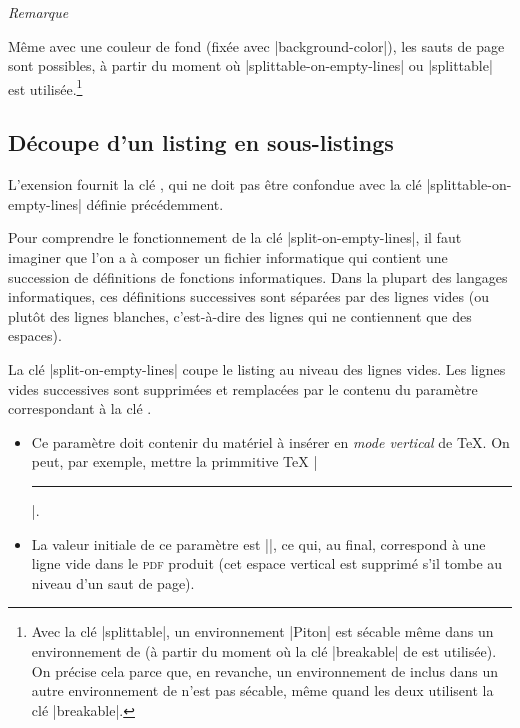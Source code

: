 \documentclass[dvipsnames,svgnames]{article}
\begin{document}
\medskip
\emph{Remarque}\par\nobreak

Même avec une couleur de fond (fixée avec |background-color|), les sauts de page sont
possibles, à partir du moment où |splittable-on-empty-lines| ou |splittable| est
utilisée.\footnote{Avec la clé |splittable|, un environnement |{Piton}| est sécable même
  dans un environnement de  (à partir du moment où la clé |breakable| de
   est utilisée). On précise cela parce que, en revanche, un environnement
  de  inclus dans un autre environnement de  n'est pas
  sécable, même quand les deux utilisent la clé |breakable|.}

\bigskip
\subsection{Découpe d'un listing en sous-listings}

\label{split-on-empty-lines}

L'exension  fournit la clé , qui ne doit pas
être confondue avec la clé |splittable-on-empty-lines| définie précédemment. 

\smallskip
Pour comprendre le fonctionnement de la clé |split-on-empty-lines|, il faut imaginer que
l'on a à composer un fichier informatique qui contient une succession de définitions de
fonctions informatiques. Dans la plupart des langages informatiques, ces définitions
successives sont séparées par des lignes vides (ou plutôt des lignes blanches,
c'est-à-dire des lignes qui ne contiennent que des espaces). 

\smallskip
La clé |split-on-empty-lines| coupe le listing au niveau des lignes vides. Les lignes
vides successives sont supprimées et remplacées par le contenu du paramètre correspondant
à la clé .
\begin{itemize}
\item Ce paramètre doit contenir du matériel à insérer en \emph{mode vertical} de TeX. On
peut, par exemple, mettre la primmitive TeX |\hrule|.

\item La valeur initiale de ce paramètre est |\vspace{\baselineskip}\vspace{-1.25pt}|, ce qui,
au final, correspond à une ligne vide dans le \textsc{pdf} produit (cet espace vertical
est supprimé s'il tombe au niveau d'un saut de page). 
\end{itemize}
\end{document}
